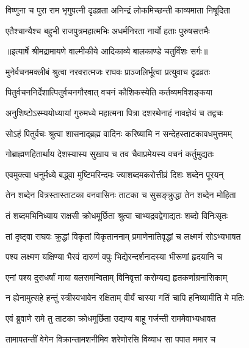\twolineshloka
{विष्णुना च पुरा राम भृगुपत्नी दृढव्रता}
{अनिन्द्रं लोकमिच्छन्ती काव्यमाता निषूदिता} %

\twolineshloka
{एतैश्चान्यैश्च बहुभी राजपुत्रमहात्मभिः}
{अधर्मनिरता नार्यो हताः पुरुषसत्तमैः} %


{॥इत्यार्षे श्रीमद्रामायणे वाल्मीकीये आदिकाव्ये बालकाण्डे चतुर्विंशः सर्गः॥}


\twolineshloka
{मुनेर्वचनमक्लीबं श्रुत्वा नरवरात्मजः}
{राघवः प्राञ्जलिर्भूत्वा प्रत्युवाच दृढव्रतः} %

\twolineshloka
{पितुर्वचननिर्देशात्पितुर्वचनगौरवात्}
{वचनं कौशिकस्येति कर्तव्यमविशङ्कया} %

\twolineshloka
{अनुशिष्टोऽस्म्ययोध्यायां गुरुमध्ये महात्मना}
{पित्रा दशरथेनाहं नावज्ञेयं च तद्वचः} %

\twolineshloka
{सोऽहं पितुर्वचः श्रुत्वा शासनाद्ब्रह्म वादिनः}
{करिष्यामि न सन्देहस्ताटकावधमुत्तमम्} %

\twolineshloka
{गोब्राह्मणहितार्थाय देशस्यास्य सुखाय च}
{तव चैवाप्रमेयस्य वचनं कर्तुमुद्यतः} %

\twolineshloka
{एवमुक्त्वा धनुर्मध्ये बद्ध्वा मुष्टिमरिन्दमः}
{ज्याशब्दमकरोत्तीव्रं दिशः शब्देन पूरयन्} %

\twolineshloka
{तेन शब्देन वित्रस्तास्ताटका वनवासिनः}
{ताटका च सुसङ्क्रुद्धा तेन शब्देन मोहिता} %

\twolineshloka
{तं शब्दमभिनिध्याय राक्षसी क्रोधमूर्छिता}
{श्रुत्वा चाभ्यद्रवद्वेगाद्यतः शब्दो विनिःसृतः} %

\twolineshloka
{तां दृष्ट्वा राघवः क्रुद्धां विकृतां विकृताननाम्}
{प्रमाणेनातिवृद्धां च लक्ष्मणं सोऽभ्यभाषत} %

\twolineshloka
{पश्य लक्ष्मण यक्षिण्या भैरवं दारुणं वपुः}
{भिद्येरन्दर्शनादस्या भीरूणां हृदयानि च} %

\twolineshloka
{एनां पश्य दुराधर्षां माया बलसमन्विताम्}
{विनिवृत्तां करोम्यद्य हृतकर्णाग्रनासिकाम्} %

\twolineshloka
{न ह्येनामुत्सहे हन्तुं स्त्रीस्वभावेन रक्षिताम्}
{वीर्यं चास्या गतिं चापि हनिष्यामीति मे मतिः} %

\twolineshloka
{एवं ब्रुवाणे रामे तु ताटका क्रोधमूर्छिता}
{उद्यम्य बाहू गर्जन्ती राममेवाभ्यधावत} %

\twolineshloka
{तामापतन्तीं वेगेन विक्रान्तामशनीमिव}
{शरेणोरसि विव्याध सा पपात ममार च} %

